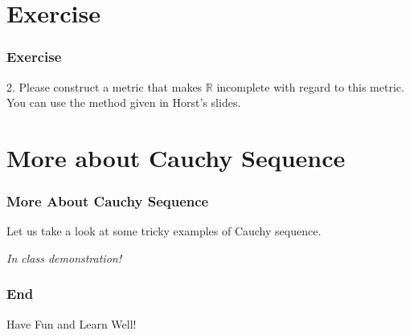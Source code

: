 \documentclass[12pt, t]{beamer}
\renewcommand{\emph}[1]{{\color{Turquoise3}\textsl{#1}}}
\begin{document}
\section{Exercise}
\begin{frame}
    \frametitle{Exercise}
    2. Please construct a metric that makes $\mathbb{R}$ incomplete with regard to this metric. You can use the method given in
    Horst's slides.
\end{frame}

\section{More about Cauchy Sequence}
\begin{frame}
    \frametitle{More About Cauchy Sequence}
    Let us take a look at some tricky examples of Cauchy sequence.\\
    \vspace{5em}
    \begin{center}
        \Large \emph{In class demonstration!}
    \end{center}
\end{frame}

\begin{frame}
    \frametitle{End}
    \vspace{2cm}
    \Huge \center  Have Fun and Learn Well!
\end{frame}
\end{document}
